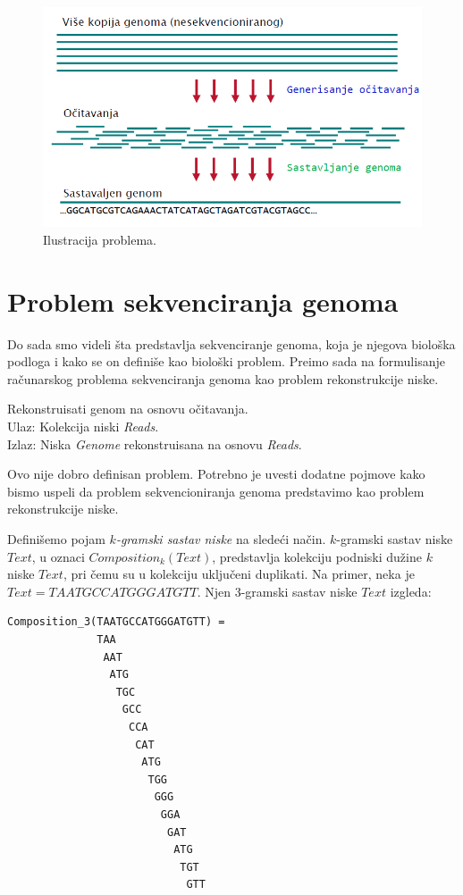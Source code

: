 \begin{figure}[h]
	\centering
	\includegraphics[width=1\textwidth]{poglavlja/3/slike/sekvencioniranje.png}
	\caption{Ilustracija problema.}
	\label{slika:sekvenciranje}
\end{figure} 

\section{Problem sekvenciranja genoma}

Do sada smo videli \v sta predstavlja sekvenciranje genoma, koja je njegova biolo\v ska podloga i kako se on defini\v se kao biolo\v ski problem. Pre\dj imo sada na formulisanje ra\v cunarskog problema sekvenciranja genoma kao problem rekonstrukcije niske.

\begin{problem} 
	Rekonstruisati genom na osnovu očitavanja. \\
	Ulaz: Kolekcija niski \emph{Reads}. \\
	Izlaz: Niska \emph{Genome} rekonstruisana na osnovu \emph{Reads}.
\end{problem}

Ovo nije dobro definisan problem. Potrebno je uvesti dodatne pojmove kako bismo uspeli da problem sekvencioniranja genoma predstavimo kao problem rekonstrukcije niske.

Defini\v semo pojam \emph{$k$-gramski sastav niske} na slede\'ci na\v cin. $k$-gramski sastav niske $Text$, u oznaci $Composition_k(Text)$, predstavlja kolekciju podniski dužine $k$ niske $Text$, pri \v cemu su u kolekciju uključeni duplikati. Na primer, neka je $Text=TAATGCCATGGGATGTT$. Njen $3$-gramski sastav niske $Text$ izgleda:

\newpage
\begin{lstlisting}
Composition_3(TAATGCCATGGGATGTT) =
              TAA 
               AAT 
                ATG
                 TGC
                  GCC
                   CCA
                    CAT
                     ATG
                      TGG
                       GGG
                        GGA
                         GAT
                          ATG
                           TGT
                            GTT
\end{lstlisting}

